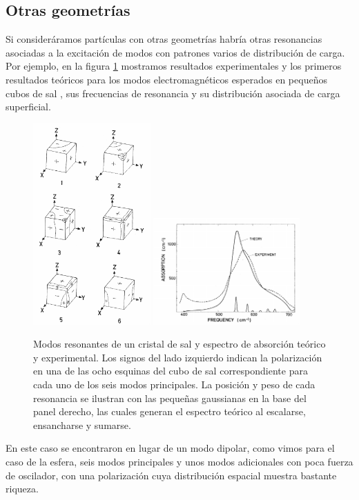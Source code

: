 \documentclass[12pt]{article}
\begin{document}
\subsection{Otras geometrías}
Si consideráramos partículas con otras geometrías habría otras
resonancias asociadas a la excitación de modos con patrones varios de
distribución de carga. Por ejemplo, en la figura \ref{fig:Fuchs}
mostramos resultados experimentales y los primeros resultados teóricos
para los modos electromagnéticos esperados en pequeños cubos de sal
\cite{Fuchs}, sus frecuencias de resonancia y su distribución asociada
de carga superficial.
\begin{figure}
  \centering
  \includegraphics[width=0.4\textwidth]{fig6a}
  \includegraphics[width=0.5\textwidth]{fig6b}
  \caption{Modos resonantes de un cristal de sal y espectro de
    absorción teórico y experimental.  Los
    signos del lado izquierdo indican la polarización en una de las
    ocho esquinas del cubo de sal correspondiente para cada uno de los
    seis modos principales. La posición y peso de cada resonancia se
    ilustran con las pequeñas gaussianas en la base del panel
    derecho, las cuales generan el espectro teórico al escalarse,
    ensancharse y sumarse.}
  \label{fig:Fuchs}
\end{figure}
En este caso se encontraron en lugar de un modo dipolar, como vimos
para el caso de la esfera, seis modos principales y unos modos
adicionales con poca fuerza de oscilador, con una polarización cuya
distribución espacial muestra bastante riqueza.
\end{document}
